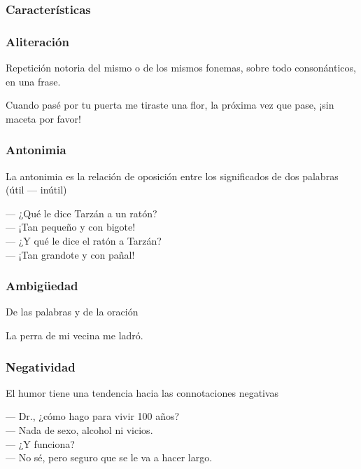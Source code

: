 \subsubsection{Características}

\begin{frame}
    \frametitle{Aliteración}

    Repetición notoria del mismo o de los mismos fonemas, sobre todo consonánticos, en una frase.
    \begin{example}
        Cuando pasé por tu puerta me tiraste una flor, la próxima vez que pase, ¡sin maceta por favor!
    \end{example}
\end{frame}

\begin{frame}
    \frametitle{Antonimia}
    
    La antonimia es la relación de oposición entre los significados de dos palabras (útil --- inútil)

    \begin{example}
        --- ¿Qué le dice Tarzán a un ratón? \\
        --- ¡Tan pequeño y con bigote! \\
        --- ¿Y qué le dice el ratón a Tarzán? \\
        --- ¡Tan grandote y con pañal! \\
    \end{example}
\end{frame}

\begin{frame}
    \frametitle{Ambigüedad}
    
    De las palabras y de la oración

    \begin{example}
        La perra de mi vecina me ladró.
    \end{example}
\end{frame}

\begin{frame}
    \frametitle{Negatividad}
    
    El humor tiene una tendencia hacia las connotaciones negativas

    \begin{example}
        --- Dr., ¿cómo hago para vivir 100 años? \\
        --- Nada de sexo, alcohol ni vicios. \\
        --- ¿Y funciona? \\
        --- No sé, pero seguro que se le va a hacer largo.
    \end{example}
\end{frame}

